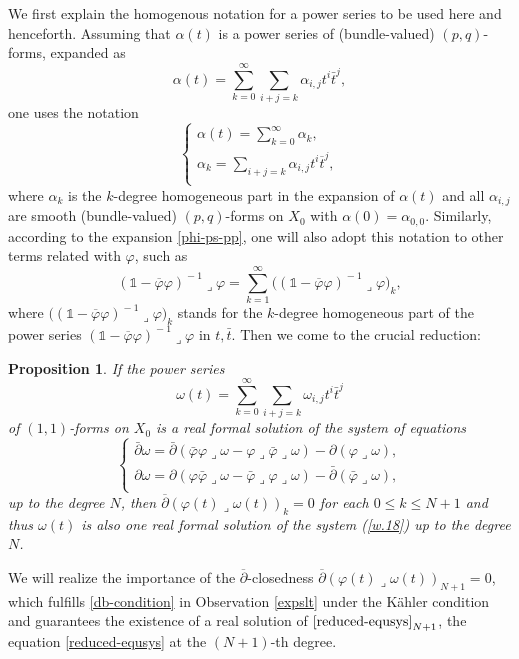 \documentclass[12pt]{amsart}
\numberwithin{equation}{section}
\newtheorem{proposition}[theorem]{Proposition}
\renewcommand{\1}{\mathds{1}}
\newcommand{\db}{\overline{\partial}}
\newcommand{\lc}{\lrcorner}
\newcommand{\lk}{\left(}
\newcommand{\rk}{\right)}
\renewcommand{\>}{\rightarrow}
\newcommand{\p}{\partial}
\def\p{\partial}
\def\b{\bar}
\def\l{\lrcorner}
\begin{document}
We first explain the homogenous notation for a power series to be
used here and henceforth. Assuming that $\alpha(t)$ is a power
series of (bundle-valued) $(p,q)$-forms, expanded as
  $$\alpha(t)=\sum_{k=0}^{\infty}\sum_{i+j=k}\alpha_{i,j}t^i\b{t}^j,$$
one uses the notation
\[ \begin{cases}
\alpha(t) = \sum^{\infty}_{k=0} \alpha_k, \\[4pt]
\alpha_k = \sum_{i+j=k} \alpha_{i,j}t^i \overline{t}^j, \\
\end{cases} \]
where $\alpha_k$ is the $k$-degree homogeneous part in the expansion
of $\alpha(t)$ and all $\alpha_{i,j}$ are smooth (bundle-valued)
$(p,q)$-forms on $X_0$ with $\alpha(0)=\alpha_{0,0}$. Similarly,
according to the expansion \eqref{phi-ps-pp}, one will also adopt this
notation to other terms related with $\varphi$, such as
\[ \lk \1 -\overline{\varphi}\varphi \rk^{\!-1} \lc
\varphi  = \sum_{k=1}^{\infty} \big( \lk \1 -\overline{\varphi}\varphi
\rk^{\!-1} \lc \varphi \big)_k, \] where $\big( \lk \1 -
\overline{\varphi}\varphi \rk^{\!-1} \lc \varphi \big)_k$ stands
for the $k$-degree homogeneous part of the power series  $\lk \1 -
\overline{\varphi}\varphi \rk^{\!-1} \lc \varphi$ in $t,\b t$.
Then we come to the crucial reduction:
\begin{proposition}\label{2.9} If the power series
  $$\omega(t)=\sum_{k=0}^{\infty}\sum_{i+j=k}\omega_{i,j}t^i\b{t}^j$$ of $(1,1)$-forms on $X_0$ is
a real formal solution of the system of equations
\begin{equation}\label{reduced-equsys}
    \begin{cases}
      \b{\p}\omega=\b{\p}(\b{\varphi}\varphi\l\omega-\varphi\l\b{\varphi}\l\omega)-\p(\varphi\l\omega),\\
      \p\omega=\p(\varphi\b{\varphi}\l\omega-\b{\varphi}\l\varphi\l\omega)-\b{\p}(\b{\varphi}\l\omega),\\
    \end{cases}
\end{equation}
up to the degree $N$, then $\db(\varphi(t)\lc \omega(t))_k=0$ for
each $0\leq k\leq N+1$ and thus $\omega(t)$ is also one real formal
solution of the system (\ref{w.18}) up to the degree $N$.
\end{proposition}

We will realize the importance of the $\db$-closedness
$\db(\varphi(t)\lc \omega(t))_{N+1}=0$, which fulfills
\eqref{db-condition} in Observation \ref{expslt} under the K\"ahler
condition and guarantees the existence of a real solution of
$\eqref{reduced-equsys}_{N+1}$, the equation \eqref{reduced-equsys}
at the $(N+1)$-th degree.
\end{document}
